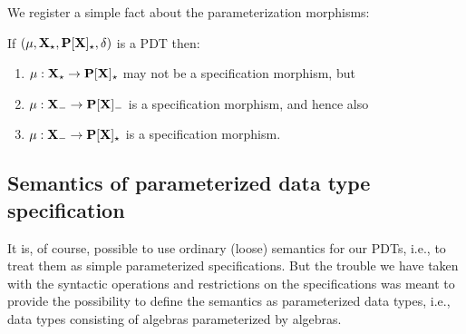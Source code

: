 We register a simple fact about the parameterization morphisms:
\begin{fact}\label{fa:weakparamo}
If $(\mu,{\bf X_\star},{\bf P[X]_\star},\delta)$ is a PDT then:
\begin{enumerate}\MyLPar
\item $\mu: {\bf X_\star} \to {\bf P[X]_\star}$ may not be a specification morphism, but
\item $\mu: {\bf X_-} \to {\bf P[X]_-}$ is a specification morphism,
and hence also
\item $\mu: {\bf X_-} \to {\bf P[X]_\star}$ is a specification morphism.
\end{enumerate}
\end{fact}

\subsection{Semantics of parameterized data type specification}
It is, of course, possible to use ordinary (loose) semantics for our PDTs,
i.e., to treat them as simple parameterized specifications. 
But the trouble we have taken with the
syntactic operations and restrictions on the specifications was meant to
provide the possibility to define the semantics as 
parameterized data types, i.e., data types consisting of algebras parameterized
by algebras. 


